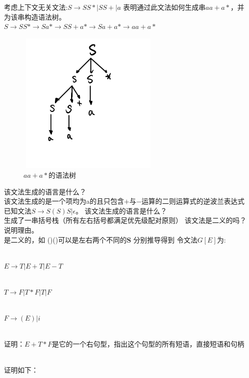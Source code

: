 \documentclass{cisXXX} %
\begin{document}
\begin{CJK}{UTF8}{gbsn}
\HWproblem
考虑上下文无关文法:\quad $ S \rightarrow SS * | SS+|a $
\HWsubproblem
表明通过此文法如何生成串$aa+a*$，并为该串构造语法树。
~\\

$S\rightarrow SS*\rightarrow Sa*\rightarrow SS+a*\rightarrow Sa+a*\rightarrow aa+a*$

\begin{figure}[ht]
	\centering
	\includegraphics[width=7cm,height=7cm]{2.png}
	\caption{$aa+a*$的语法树}
	\label{fig:label}
\end{figure}    

\HWsubproblem
该文法生成的语言是什么？
~\\

该文法生成的是一个项均为a的且只包含$+$与$-$运算的二则运算式的逆波兰表达式
\HWproblem
已知文法$S\rightarrow S(S)S| \epsilon $。
\HWsubproblem
该文法生成的语言是什么？
~\\

生成了一串括号栈（所有左右括号都满足优先级配对原则）
\HWsubproblem
该文法是二义的吗？说明理由。
~\\

是二义的，如 ()()可以是左右两个不同的\textbf{S} 分别推导得到
\HWproblem
令文法$G[E]$为:

~\\
$E\rightarrow T|E+T|E-T$

~\\
$T\rightarrow F|T*F|T|F$

~\\
$F\rightarrow (E)|i$

~\\
证明：$E+T*F$是它的一个右句型，指出这个句型的所有短语，直接短语和句柄

~\\
证明如下：
~\\


\end{CJK}
\end{document}
